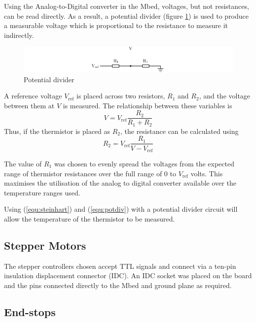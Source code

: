 			Using the Analog-to-Digital converter in the Mbed, voltages, but not
			resistances, can be read directly. As a result, a potential divider
			(figure \ref{fig:potentialDiv}) is used to produce a measurable voltage
			which is proportional to the resistance to measure it indirectly.
			\begin{figure}
				\includegraphics[width=1\textwidth]{diagrams/potentialDiv.pdf}
				\caption{Potential divider}
				\label{fig:potentialDiv}
			\end{figure}
			A reference voltage $V_\textrm{ref}$ is placed across two resistors,
			$R_1$ and $R_2$, and the voltage between them at $V$ is measured. The
			relationship between these variables is
			\begin{equation}
				V = V_\textrm{ref} \frac{R_2}{R_1 + R_2}
			\end{equation}
			Thus, if the thermistor is placed as $R_2$, the resistance can be
			calculated using
			\begin{equation}
				R_2 = V_\textrm{ref} \frac{R_1}{V - V_\textrm{ref}}
				\label{equ:potdiv}
			\end{equation}
			
			The value of $R_1$ was chosen to evenly spread the voltages from the
			expected range of thermistor resistances over the full range of 0 to
			$V_\textrm{ref}$ volts. This maximises the utilisation of the analog to
			digital converter available over the temperature ranges used.
			
			Using (\ref{equ:steinhart}) and (\ref{equ:potdiv}) with a potential
			divider circuit will allow the temperature of the thermistor to be
			measured.
			
		
		\subsection{Stepper Motors}
			
			The stepper controllers chosen accept TTL signals and connect via a
			ten-pin insulation displacement connector (IDC). An IDC socket was
			placed on the board and the pins connected directly to the Mbed and
			ground plane as required.
		
		\subsection{End-stops}
			
